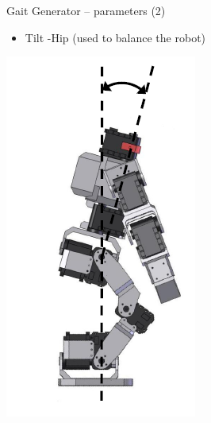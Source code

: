 \documentclass[compress]{beamer}
\begin{document}
\begin{frame}{Gait Generator -- parameters (2)}

    \begin{itemize}

        \item Tilt -Hip (used to balance the robot)
    \end{itemize}
    \begin{center}
        \includegraphics[height=0.5\paperheight]{bioloid-gait-2}
    \end{center}

\end{frame}
\end{document}
